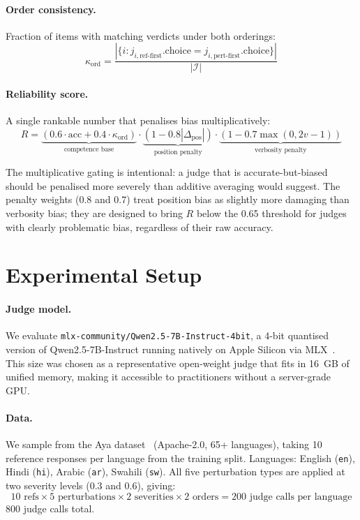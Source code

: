 \documentclass[11pt]{article}
\begin{document}
\paragraph{Order consistency.} Fraction of items with matching verdicts under both orderings:
\[
\kappa_{\text{ord}} = \frac{|\{i : j_{i,\text{ref-first}}.\text{choice} = j_{i,\text{pert-first}}.\text{choice}\}|}{|\mathcal{I}|}
\]

\paragraph{Reliability score.} A single rankable number that penalises bias multiplicatively:
\[
R = \underbrace{(0.6 \cdot \text{acc} + 0.4 \cdot \kappa_{\text{ord}})}_{\text{competence base}} \cdot \underbrace{(1 - 0.8 |\Delta_{\text{pos}}|)}_{\text{position penalty}} \cdot \underbrace{(1 - 0.7 \max(0, 2v - 1))}_{\text{verbosity penalty}}
\]

The multiplicative gating is intentional: a judge that is accurate-but-biased should be penalised more severely than additive averaging would suggest. The penalty weights (0.8 and 0.7) treat position bias as slightly more damaging than verbosity bias; they are designed to bring $R$ below the 0.65 threshold for judges with clearly problematic bias, regardless of their raw accuracy.

\section{Experimental Setup}
\label{sec:setup}

\paragraph{Judge model.} We evaluate \texttt{mlx-community/Qwen2.5-7B-Instruct-4bit}, a 4-bit quantised version of Qwen2.5-7B-Instruct running natively on Apple Silicon via MLX~\cite{mlx2023}. This size was chosen as a representative open-weight judge that fits in 16~GB of unified memory, making it accessible to practitioners without a server-grade GPU.

\paragraph{Data.} We sample from the Aya dataset~\cite{singh2024aya} (Apache-2.0, 65+ languages), taking 10 reference responses per language from the training split. Languages: English (\texttt{en}), Hindi (\texttt{hi}), Arabic (\texttt{ar}), Swahili (\texttt{sw}). All five perturbation types are applied at two severity levels (0.3 and 0.6), giving:
\[
10 \text{ refs} \times 5 \text{ perturbations} \times 2 \text{ severities} \times 2 \text{ orders} = 200 \text{ judge calls per language}
\]
800 judge calls total.
\end{document}
